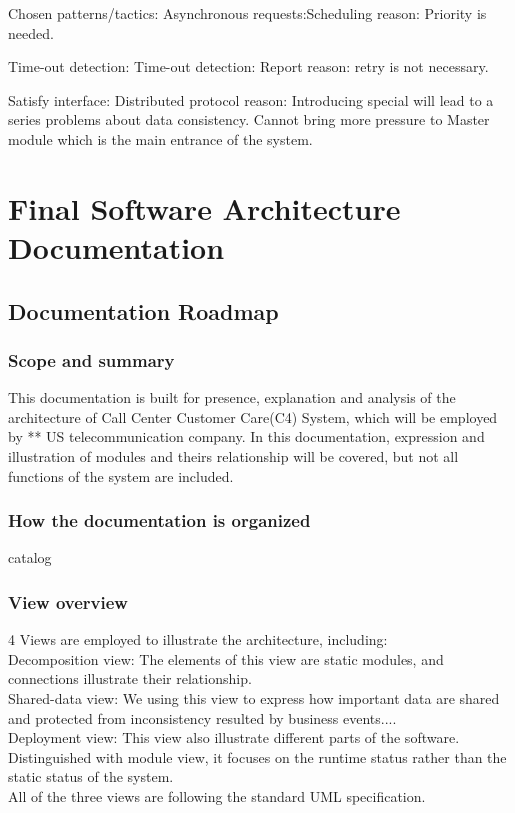 \documentclass{article}
\begin{document}
		Chosen patterns/tactics:
		Asynchronous requests:Scheduling
		reason: Priority is needed.

		Time-out detection:
		Time-out detection: Report
		reason: retry is not necessary.

		Satisfy interface: Distributed protocol
		reason: Introducing special will lead to a series problems about data consistency. Cannot bring more pressure to Master module which is the main entrance of the system.


		
		

	\section{Final Software Architecture Documentation}
	\subsection{Documentation Roadmap}
	\subsubsection{Scope and summary}
	This documentation is built for presence, explanation and analysis of the architecture of Call Center Customer Care(C4) System, which will be employed by ** US telecommunication company. In this documentation, expression and illustration of modules and theirs relationship will be covered, but not all functions of the system are included.
	\subsubsection{How the documentation is organized}
	catalog
	\subsubsection{View overview}
	4 Views are employed to illustrate the architecture, including:\\  
	Decomposition view: The elements of this view are static modules, and connections illustrate their relationship.\\  
	Shared-data view: We using this view to express how important data are shared and protected from inconsistency resulted by business events....  \\
	Deployment view: This view also illustrate different parts of the software. Distinguished with module view, it focuses on the runtime status rather than the static status of the system.\\
	All of the three views are following the standard UML specification.
\end{document}
